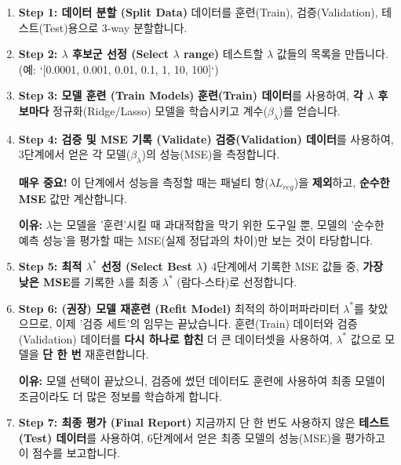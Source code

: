 \documentclass[11pt,a4paper]{book}
\theoremstyle{definition}
\begin{document}
\begin{enumerate}
    \item \textbf{Step 1: 데이터 분할 (Split Data)}
    데이터를 훈련(Train), 검증(Validation), 테스트(Test)용으로 3-way 분할합니다.

    \item \textbf{Step 2: $\lambda$ 후보군 선정 (Select $\lambda$ range)}
    테스트할 $\lambda$ 값들의 목록을 만듭니다. (예: `[0.0001, 0.001, 0.01, 0.1, 1, 10, 100]`)

    \item \textbf{Step 3: 모델 훈련 (Train Models)}
    \textbf{훈련(Train) 데이터}를 사용하여, \textbf{각 $\lambda$ 후보마다} 정규화(Ridge/Lasso) 모델을 학습시키고 계수($\beta_{\lambda}$)를 얻습니다.

    \item \textbf{Step 4: 검증 및 MSE 기록 (Validate)}
    \textbf{검증(Validation) 데이터}를 사용하여, 3단계에서 얻은 각 모델($\beta_{\lambda}$)의 성능(MSE)을 측정합니다.

    \begin{warningbox}
    \textbf{매우 중요!} 이 단계에서 성능을 측정할 때는 패널티 항($\lambda L_{reg}$)을 \textbf{제외}하고, \textbf{순수한 MSE} 값만 계산합니다.
    
    \textbf{이유:} $\lambda$는 모델을 '훈련'시킬 때 과대적합을 막기 위한 도구일 뿐, 모델의 '순수한 예측 성능'을 평가할 때는 MSE(실제 정답과의 차이)만 보는 것이 타당합니다.
    \end{warningbox}

    \item \textbf{Step 5: 최적 $\lambda^*$ 선정 (Select Best $\lambda$)}
    4단계에서 기록한 MSE 값들 중, \textbf{가장 낮은 MSE}를 기록한 $\lambda$를 최종 $\lambda^*$ (람다-스타)로 선정합니다.

    \item \textbf{Step 6: (권장) 모델 재훈련 (Refit Model)}
    최적의 하이퍼파라미터 $\lambda^*$를 찾았으므로, 이제 '검증 세트'의 임무는 끝났습니다.
    훈련(Train) 데이터와 검증(Validation) 데이터를 \textbf{다시 하나로 합친} 더 큰 데이터셋을 사용하여, $\lambda^*$ 값으로 모델을 \textbf{단 한 번} 재훈련합니다.
    
    \textbf{이유:} 모델 선택이 끝났으니, 검증에 썼던 데이터도 훈련에 사용하여 최종 모델이 조금이라도 더 많은 정보를 학습하게 합니다.

    \item \textbf{Step 7: 최종 평가 (Final Report)}
    지금까지 단 한 번도 사용하지 않은 \textbf{테스트(Test) 데이터}를 사용하여, 6단계에서 얻은 최종 모델의 성능(MSE)을 평가하고 이 점수를 보고합니다.
\end{enumerate}
\end{document}
